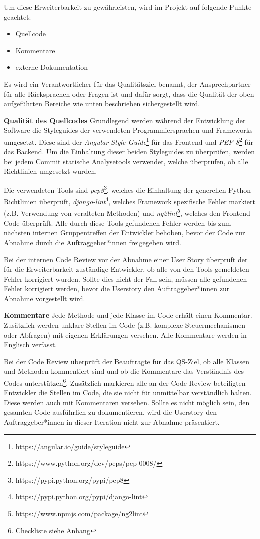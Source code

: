 \documentclass[accentcolor=tud0b,12pt,paper=a4]{tudreport}
\begin{document}
Um diese Erweiterbarkeit zu gewährleisten, wird im Projekt auf folgende Punkte geachtet:
\begin{itemize}
	\item Quellcode
	\item Kommentare
	\item externe Dokumentation
\end{itemize}

Es wird ein Verantwortlicher für das Qualitätsziel benannt, der Ansprechpartner für alle Rücksprachen oder Fragen ist und dafür sorgt, dass die Qualität der oben aufgeführten Bereiche wie unten beschrieben sichergestellt wird.

\textbf{Qualität des Quellcodes}
Grundlegend werden während der Entwicklung der Software die Styleguides der verwendeten Programmiersprachen und Frameworks umgesetzt. Diese sind der \emph{Angular Style Guide}\footnote{https://angular.io/guide/styleguide} für das Frontend und \emph{PEP 8}\footnote{https://www.python.org/dev/peps/pep-0008/} für das Backend. Um die Einhaltung dieser beiden Styleguides zu überprüfen, werden bei jedem Commit statische Analysetools verwendet, welche überprüfen, ob alle Richtlinien umgesetzt wurden.

Die verwendeten Tools sind \emph{pep8}\footnote{https://pypi.python.org/pypi/pep8}, welches die Einhaltung der generellen Python Richtlinien überprüft, \emph{django-lint}\footnote{https://pypi.python.org/pypi/django-lint}, welches Framework spezifische Fehler markiert (z.B. Verwendung von veralteten Methoden) und \emph{ng2lint}\footnote{https://www.npmjs.com/package/ng2lint}, welches den Frontend Code überprüft. Alle durch diese Tools gefundenen Fehler werden bis zum nächsten internen Gruppentreffen der Entwickler behoben, bevor der Code zur Abnahme durch die Auftraggeber*innen freigegeben wird.

Bei der internen Code Review vor der Abnahme einer User Story überprüft der für die Erweiterbarkeit zuständige Entwickler, ob alle von den Tools gemeldeten Fehler korrigiert wurden. Sollte dies nicht der Fall sein, müssen alle gefundenen Fehler korrigiert werden, bevor die Userstory den Auftraggeber*innen zur Abnahme vorgestellt wird.


\textbf{Kommentare}
Jede Methode und jede Klasse im Code erhält einen Kommentar. Zusätzlich werden unklare Stellen im Code (z.B. komplexe Steuermechanismen oder Abfragen) mit eigenen Erklärungen versehen. Alle Kommentare werden in Englisch verfasst.

Bei der Code Review überprüft der Beauftragte für das QS-Ziel, ob alle Klassen und Methoden kommentiert sind und ob die Kommentare das Verständnis des Codes unterstützen\footnote{Checkliste siehe Anhang}. Zusätzlich markieren alle an der Code Review beteiligten Entwickler die Stellen im Code, die sie nicht für unmittelbar verständlich halten. Diese werden auch mit Kommentaren versehen. Sollte es nicht möglich sein, den gesamten Code ausführlich zu dokumentieren, wird die Userstory den Auftraggeber*innen in dieser Iteration nicht zur Abnahme präsentiert.
\end{document}

